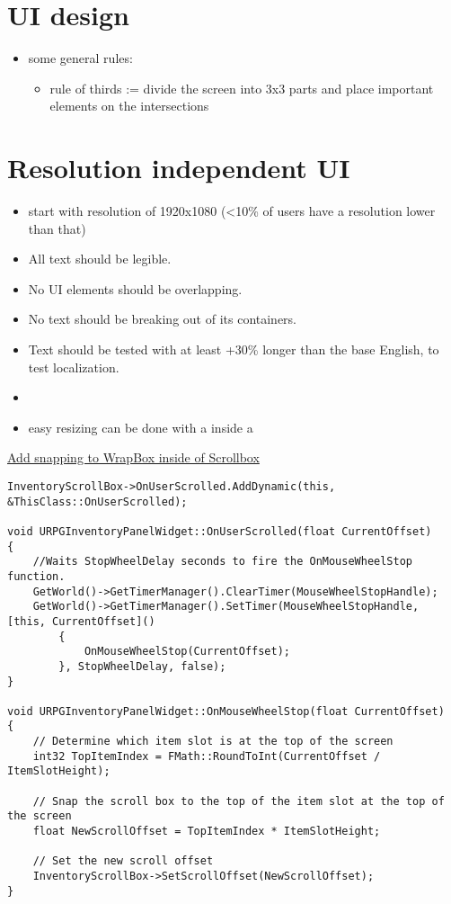     \section{UI design}
        \begin{itemize}
            \item some general rules:
            \begin{itemize}
                \item rule of thirds := divide the screen into 3x3 parts and place important elements on the intersections
            \end{itemize}
        \end{itemize}
                


    \section{Resolution independent UI}
        \begin{itemize}
            \item start with resolution of 1920x1080 (<10\% of users have a resolution lower than that)
            \item All text should be legible.
            \item No UI elements should be overlapping.
            \item No text should be breaking out of its containers.
            \item Text should be tested with at least +30\% longer than the base English, to test localization.
            \item 
            \item easy resizing can be done with a  inside a  
        \end{itemize}



\uline{Add snapping to WrapBox inside of Scrollbox}
\begin{lstlisting}
InventoryScrollBox->OnUserScrolled.AddDynamic(this, &ThisClass::OnUserScrolled);

void URPGInventoryPanelWidget::OnUserScrolled(float CurrentOffset)
{
    //Waits StopWheelDelay seconds to fire the OnMouseWheelStop function.
    GetWorld()->GetTimerManager().ClearTimer(MouseWheelStopHandle);
    GetWorld()->GetTimerManager().SetTimer(MouseWheelStopHandle, [this, CurrentOffset]()
        {
            OnMouseWheelStop(CurrentOffset);
        }, StopWheelDelay, false);
}

void URPGInventoryPanelWidget::OnMouseWheelStop(float CurrentOffset)
{
    // Determine which item slot is at the top of the screen
    int32 TopItemIndex = FMath::RoundToInt(CurrentOffset / ItemSlotHeight);

    // Snap the scroll box to the top of the item slot at the top of the screen
    float NewScrollOffset = TopItemIndex * ItemSlotHeight;

    // Set the new scroll offset
    InventoryScrollBox->SetScrollOffset(NewScrollOffset);
}
\end{lstlisting}
\bigskip

